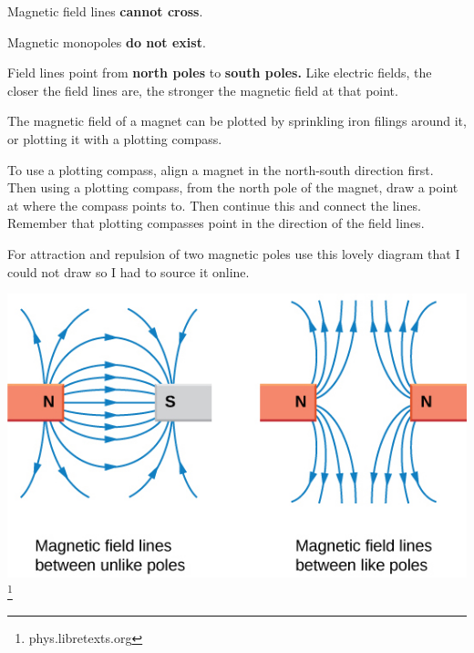 \documentclass[../main.tex]{subfiles}
\begin{document}
	Magnetic field lines \textbf{cannot cross}.
	
	Magnetic monopoles \textbf{do not exist}.
	
	Field lines point from \textbf{north poles} to \textbf{south poles.} Like electric fields, the closer the field lines are, the stronger the magnetic field at that point.
	\begin{center}
	\end{center}
	
	The magnetic field of a magnet can be plotted by sprinkling iron filings around it, or plotting it with a plotting compass.
	
	To use a plotting compass, align a magnet in the north-south direction first. Then using a plotting compass, from the north pole of the magnet, draw a point at where the compass points to. Then continue this and connect the lines. Remember that plotting compasses point in the direction of the field lines.
	
	For attraction and repulsion of two magnetic poles use this lovely diagram that I could not draw so I had to source it online.
	\begin{center}
		\includegraphics[width=0.85\linewidth]{graphics/magnetismFieldLines}\footnote{phys.libretexts.org}
	\end{center}
\end{document}
